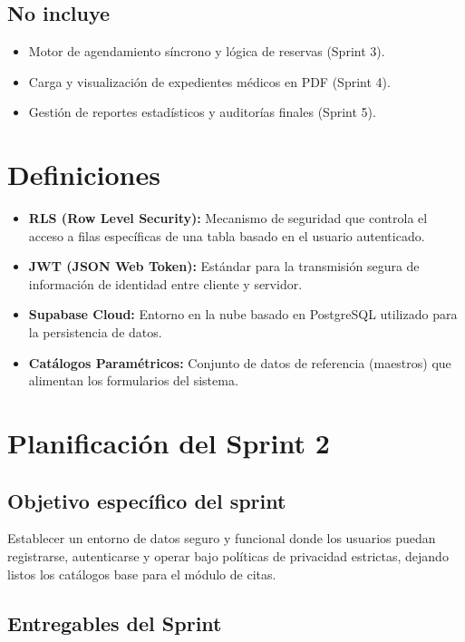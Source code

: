 \documentclass[a4paper,12pt]{article}
\begin{document}
\subsection{No incluye}
\begin{itemize}
    \item Motor de agendamiento síncrono y lógica de reservas (Sprint 3).
    \item Carga y visualización de expedientes médicos en PDF (Sprint 4).
    \item Gestión de reportes estadísticos y auditorías finales (Sprint 5).
\end{itemize}

\section{Definiciones}
\begin{itemize}
    \item \textbf{RLS (Row Level Security):} Mecanismo de seguridad que controla el acceso a filas específicas de una tabla basado en el usuario autenticado.
    \item \textbf{JWT (JSON Web Token):} Estándar para la transmisión segura de información de identidad entre cliente y servidor.
    \item \textbf{Supabase Cloud:} Entorno en la nube basado en PostgreSQL utilizado para la persistencia de datos.
    \item \textbf{Catálogos Paramétricos:} Conjunto de datos de referencia (maestros) que alimentan los formularios del sistema.
\end{itemize}

\section{Planificación del Sprint 2}

\subsection{Objetivo específico del sprint}
Establecer un entorno de datos seguro y funcional donde los usuarios puedan registrarse, autenticarse y operar bajo políticas de privacidad estrictas, dejando listos los catálogos base para el módulo de citas.

\subsection{Entregables del Sprint}
\end{document}
